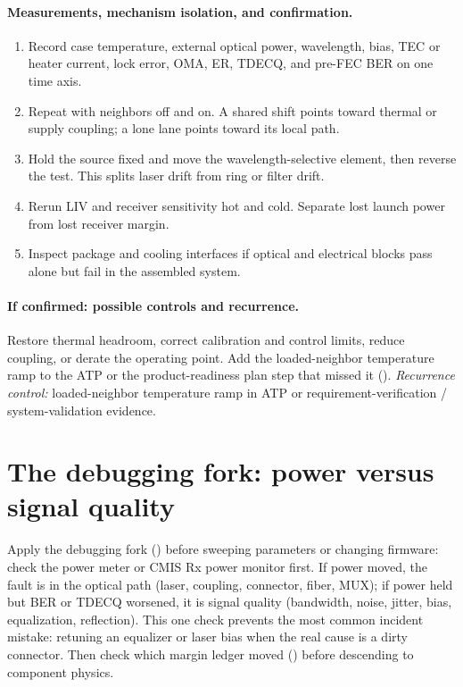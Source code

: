 \paragraph{Measurements, mechanism isolation, and confirmation.}
\begin{enumerate}
\item Record case temperature, external optical power, wavelength, bias, TEC or
      heater current, lock error, OMA, ER, TDECQ, and pre-FEC BER on one time axis.
\item Repeat with neighbors off and on. A shared shift points toward thermal or
      supply coupling; a lone lane points toward its local path.
\item Hold the source fixed and move the wavelength-selective element, then reverse
      the test. This splits laser drift from ring or filter drift.
\item Rerun LIV and receiver sensitivity hot and cold. Separate lost launch power
      from lost receiver margin.
\item Inspect package and cooling interfaces if optical and electrical blocks pass
      alone but fail in the assembled system.
\end{enumerate}

\paragraph{If confirmed: possible controls and recurrence.}
Restore thermal headroom, correct calibration and control limits, reduce coupling,
or derate the operating point. Add the loaded-neighbor temperature ramp to the ATP
or the product-readiness plan step that missed it
().
\emph{Recurrence control:} loaded-neighbor temperature ramp in ATP or
requirement-verification / system-validation evidence.


\section{The debugging fork: power versus signal quality}
\label{sec:validation-fork}

Apply the debugging fork () before sweeping parameters or
changing firmware: check the power meter or CMIS Rx power monitor first. If power
moved, the fault is in the optical path (laser, coupling, connector, fiber, MUX);
if power held but BER or TDECQ worsened, it is signal quality (bandwidth, noise,
jitter, bias, equalization, reflection). This one check prevents the most common
incident mistake: retuning an equalizer or laser bias when the real cause is a
dirty connector. Then check which margin ledger moved
() before descending to component physics.

